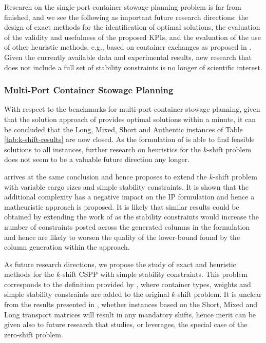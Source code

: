 \documentclass[preprint,12pt,authoryear]{elsarticle}
\begin{document}
Research on the single-port container stowage planning problem is far from finished, and we see the following as important future research directions: the design of exact methods for the identification of optimal solutions, the evaluation of the validity and usefulness of the proposed KPIs, and the evaluation of the use of other heuristic methods, e.g., based on container exchanges as proposed in \cite{Cho1981DevelopmentPlanning,Ambrosino2006AProblem}. Given the currently available data and experimental results, new research that does not include a full set of stability constraints is no longer of scientific interest.

\subsubsection{Multi-Port Container Stowage Planning}
With respect to the benchmarks for multi-port container stowage planning, given that the solution approach of \cite{Roberti2018APlans} provides optimal solutions within a minute, it can be concluded that the Long, Mixed, Short and Authentic instances of Table \ref{tab:k-shift-results} are now closed. As the formulation of \cite{Parreno-Torres2021SolvingAlgorithm} is able to find feasible solutions to all instances, further research on heuristics for the $k$-shift problem does not seem to be a valuable future direction any longer.

\cite{Parreno-Torres2021SolvingAlgorithm} arrives at the same conclusion and hence proposes to extend the $k$-shift problem with variable cargo sizes and simple stability constraints. It is shown that the additional complexity has a negative impact on the IP formulation and hence a matheuristic approach is proposed. It is likely that similar results could be obtained by extending the work of \cite{Roberti2018APlans} as the stability constraints would increase the number of constraints posted across the generated columns in the formulation and hence are likely to worsen the quality of the lower-bound found by the column generation within the approach.

As future research directions, we propose the study of exact and heuristic methods for the $k$-shift CSPP with simple stability constraints. This problem corresponds to the definition provided by \cite{Parreno-Torres2021SolvingAlgorithm}, where container types, weights and simple stability constraints are added to the original $k$-shift problem. It is unclear from the results presented in \cite{Parreno-Torres2021SolvingAlgorithm}, whether instances based on the Short, Mixed and Long transport matrices will result in any mandatory shifts, hence merit can be given also to future research  that studies, or leverages, the special case of the zero-shift problem.
\end{document}
